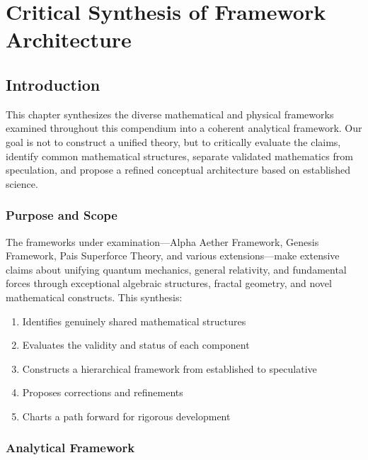 
\chapter{Critical Synthesis of Framework Architecture}
\label{ch:unified_framework}

\section{Introduction}

This chapter synthesizes the diverse mathematical and physical frameworks examined throughout this compendium into a coherent analytical framework. Our goal is not to construct a unified theory, but to critically evaluate the claims, identify common mathematical structures, separate validated mathematics from speculation, and propose a refined conceptual architecture based on established science.

\subsection{Purpose and Scope}

The frameworks under examination---Alpha Aether Framework, Genesis Framework, Pais Superforce Theory, and various extensions---make extensive claims about unifying quantum mechanics, general relativity, and fundamental forces through exceptional algebraic structures, fractal geometry, and novel mathematical constructs. This synthesis:

\begin{enumerate}
    \item Identifies genuinely shared mathematical structures
    \item Evaluates the validity and status of each component
    \item Constructs a hierarchical framework from established to speculative
    \item Proposes corrections and refinements
    \item Charts a path forward for rigorous development
\end{enumerate}

\subsection{Analytical Framework}

